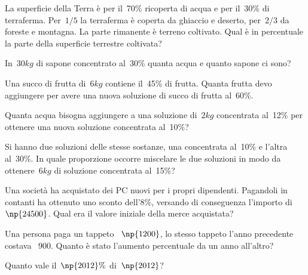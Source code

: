 \begin{multicols}{2}
\begin{esercizio}[\Ast]
 \label{ese:3.109}
La superficie della Terra è per il~70\% ricoperta di acqua e per il~30\% di terraferma.
Per~$1/5$ la terraferma è coperta da ghiaccio e deserto, per~$2/3$ da foreste e montagna.
La parte rimanente è terreno coltivato. Qual è in percentuale la parte della superficie terrestre coltivata?
\end{esercizio}

\begin{esercizio}[\Ast]
 \label{ese:3.110}
In~$30\unit{kg}$ di sapone concentrato al~30\% quanta acqua e quanto sapone ci sono?
\end{esercizio}

\begin{esercizio}
 \label{ese:3.111}
Una succo di frutta di~$6\unit{kg}$ contiene il~45\% di frutta. Quanta frutta devo aggiungere per avere una nuova soluzione di succo di frutta al~60\%.
\end{esercizio}

\begin{esercizio}
 \label{ese:3.112}
Quanta acqua bisogna aggiungere a una soluzione di~$2\unit{kg}$
concentrata al~12\% per ottenere una nuova soluzione concentrata al~10\%?
\end{esercizio}

\begin{esercizio}
 \label{ese:3.113}
Si hanno due soluzioni delle stesse sostanze, una concentrata al~10\% e l'altra al~30\%.
In quale proporzione occorre miscelare le due soluzioni in modo da ottenere~$6\unit{kg}$
di soluzione concentrata al~15\%?
\end{esercizio}

\begin{esercizio}
 \label{ese:3.114}
Una società ha acquistato dei PC nuovi per i propri dipendenti. Pagandoli in contanti ha ottenuto uno sconto dell'8\%,
versando di conseguenza l'importo di \officialeuro~$\np{24500}$. Qual era il valore iniziale della merce acquistata?
\end{esercizio}

\begin{esercizio}
 \label{ese:3.115}
Una persona paga un tappeto \officialeuro~$\np{1200}$, lo stesso tappeto l'anno precedente costava \officialeuro~$900$.
Quanto è stato l'aumento percentuale da un anno all'altro?
\end{esercizio}

\begin{esercizio}
 \label{ese:3.116}
Quanto vale il~$\np{2012}\%$ di~$\np{2012}$?
\end{esercizio}
\end{multicols}

